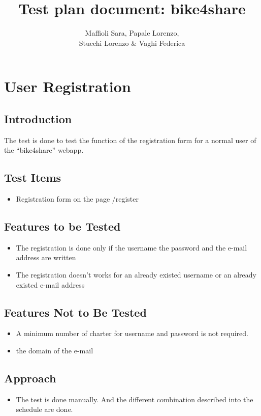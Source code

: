 \documentclass{article}
\title{Test plan document: bike4share}
\author{Maffioli Sara, Papale Lorenzo, \\ Stucchi Lorenzo \& Vaghi Federica}
\begin{document}
\maketitle
\tableofcontents

\newpage

\section{User Registration}
\subsection{Introduction}
The test is done to test the function of the registration form for a normal user of the “bike4share” webapp.
\subsection{Test Items}
\begin{itemize}
    \item Registration form on the page /register
\end{itemize}
\subsection{Features to be Tested}
\begin{itemize}
    \item The registration is done only if the username the password and the e-mail address are written
    \item The registration doesn’t works for an already existed username or an already existed e-mail address
\end{itemize}
\subsection{Features Not to Be Tested}
\begin{itemize}
    \item A minimum number of charter for username and password is not required. 
    \item the domain of the e-mail
\end{itemize}
\subsection{Approach}
\begin{itemize}
    \item The test is done manually. And the different combination described into the schedule are done. 
\end{itemize}
\end{document}
